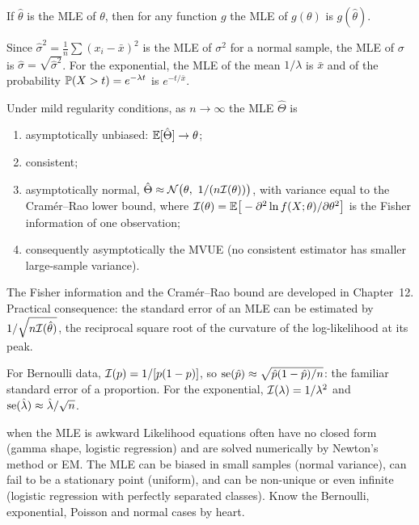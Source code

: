 \begin{theorem}\label{thm:invariance}
If $\hat\theta$ is the MLE of $\theta$, then for any function $g$ the MLE of $g(\theta)$ is $g(\hat\theta)$.
\end{theorem}

\begin{example}
Since $\hat\sigma^2=\frac1n\sum(x_i-\bar{x})^2$ is the MLE of $\sigma^2$ for a normal sample, the MLE of $\sigma$ is $\hat\sigma=\sqrt{\hat\sigma^2}$. For the exponential, the MLE of the mean $1/\lambda$ is $\bar{x}$ and of the probability $\mathbb{P}(X>t)=e^{-\lambda t}$ is $e^{-t/\bar{x}}$.
\end{example}

\begin{theorem}\label{thm:mleasymp}
Under mild regularity conditions, as $n\to\infty$ the MLE $\hat\Theta$ is
\begin{enumerate}[label=(\roman*)]
  \item asymptotically unbiased: $\mathbb{E}[\hat\Theta]\to\theta$;
  \item consistent;
  \item asymptotically normal, $\hat\Theta\approx\Normal\big(\theta,\ 1/(n\Fish(\theta))\big)$, with variance equal to the Cram\'er--Rao lower bound, where $\mathcal{I}(\theta)=\mathbb{E}\big[-\partial^2\ln f(X;\theta)/\partial\theta^2\big]$ is the Fisher information of one observation;
  \item consequently asymptotically the MVUE (no consistent estimator has smaller large-sample variance).
\end{enumerate}
\end{theorem}

The Fisher information and the Cram\'er--Rao bound are developed in Chapter~12. Practical consequence: the standard error of an MLE can be estimated by $1/\sqrt{n\mathcal{I}(\hat\theta)}$, the reciprocal square root of the curvature of the log-likelihood at its peak.

\begin{example}
For Bernoulli data, $\mathcal{I}(p)=1/[p(1-p)]$, so $\operatorname{se}(\hat{p})\approx\sqrt{\hat{p}(1-\hat{p})/n}$: the familiar standard error of a proportion. For the exponential, $\mathcal{I}(\lambda)=1/\lambda^2$ and $\operatorname{se}(\hat\lambda)\approx\hat\lambda/\sqrt n$.
\end{example}

\begin{interview}{when the MLE is awkward}
Likelihood equations often have no closed form (gamma shape, logistic regression) and are solved numerically by Newton's method or EM. The MLE can be biased in small samples (normal variance), can fail to be a stationary point (uniform), and can be non-unique or even infinite (logistic regression with perfectly separated classes). Know the Bernoulli, exponential, Poisson and normal cases by heart.
\end{interview}

